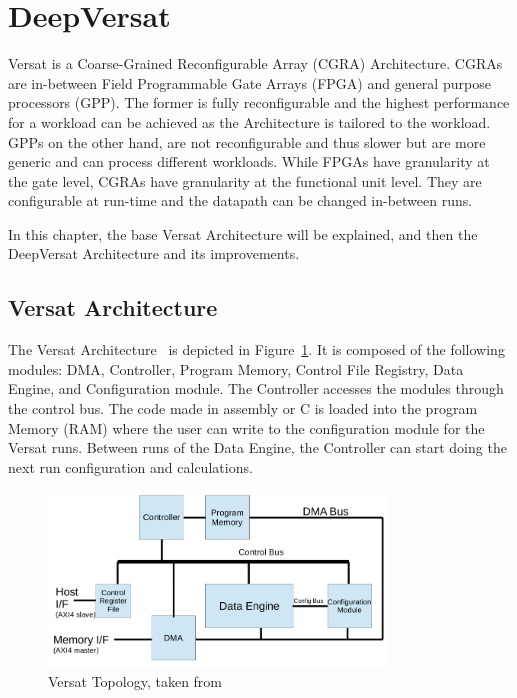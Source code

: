 \section{DeepVersat}
\label{sector:DeepVersat}

\quad Versat is a Coarse-Grained Reconfigurable Array (CGRA) Architecture. CGRAs are in-between Field Programmable Gate Arrays (FPGA)
 and general purpose processors (GPP).
The former is fully reconfigurable and the highest performance for a workload can be achieved as the Architecture is tailored to the workload.
GPPs on the other hand, are not reconfigurable and thus slower but are more generic and can process different workloads.
While FPGAs have granularity at the gate level, CGRAs have granularity at the functional unit level. They are configurable at run-time and the datapath can be
changed in-between runs.   

In this chapter, the base Versat Architecture will be explained, and then the DeepVersat Architecture
 and its improvements.

\subsection{Versat Architecture}

\quad The Versat Architecture~\cite{sousa:compiler,sousa:controller,sousa:FFT,sousa:versat2016} 
is depicted in Figure~\ref{figure:oldversat}. It is composed of the following modules: DMA, Controller, Program Memory, Control File Registry, Data Engine, and Configuration module.
The Controller accesses the modules through the control bus. The code made in assembly or C is loaded into the program Memory (RAM) where the user
can write to the configuration module for the Versat runs. Between runs of the Data Engine,
 the Controller can start doing the next run configuration and calculations.


\begin{figure}[!htbp]
    \centering
    \includegraphics[width=0.8\textwidth]{Figures/top.png}
    \caption{Versat Topology, taken from~\cite{sousa:controller}}
    \label{figure:oldversat}
\end{figure} 

